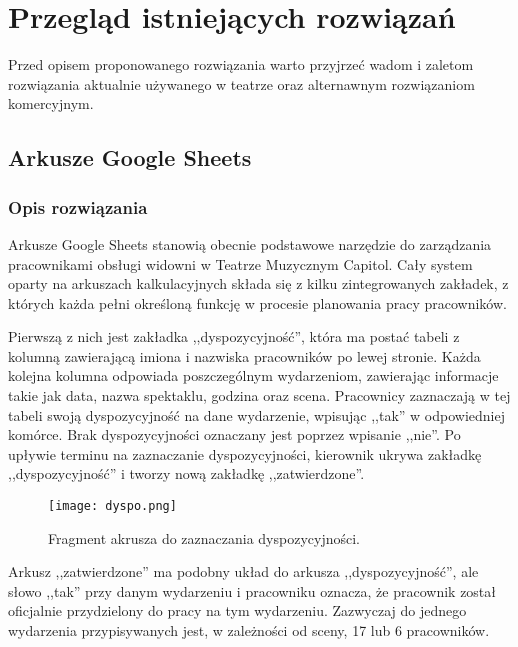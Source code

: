 \documentclass[shortabstract]{iithesis}
\begin{document}
\section{Przegląd istniejących rozwiązań}

Przed opisem proponowanego rozwiązania warto przyjrzeć wadom i zaletom rozwiązania aktualnie używanego w teatrze oraz alternawnym rozwiązaniom komercyjnym.

\subsection{Arkusze Google Sheets}

\subsubsection{Opis rozwiązania}
Arkusze Google Sheets stanowią obecnie podstawowe narzędzie do zarządzania pracownikami obsługi widowni w Teatrze Muzycznym Capitol. Cały system oparty na arkuszach kalkulacyjnych składa się z kilku zintegrowanych zakładek, z których każda pełni określoną funkcję w procesie planowania pracy pracowników.

Pierwszą z nich jest zakładka ,,dyspozycyjność'', która ma postać tabeli z kolumną zawierającą imiona i nazwiska pracowników po lewej stronie. Każda kolejna kolumna odpowiada poszczególnym wydarzeniom, zawierając informacje takie jak data, nazwa spektaklu, godzina oraz scena. Pracownicy zaznaczają w tej tabeli swoją dyspozycyjność na dane wydarzenie, wpisując ,,tak'' w odpowiedniej komórce. Brak dyspozycyjności oznaczany jest poprzez wpisanie ,,nie''. Po upływie terminu na zaznaczanie dyspozycyjności, kierownik ukrywa zakładkę ,,dyspozycyjność'' i tworzy nową zakładkę ,,zatwierdzone''.


\begin{figure}[h] %
\centering %
\texttt{[image: dyspo.png]} %
\caption{Fragment akrusza do zaznaczania dyspozycyjności.} %
\end{figure}


Arkusz ,,zatwierdzone'' ma podobny układ do arkusza ,,dyspozycyjność'', ale słowo ,,tak'' przy danym wydarzeniu i pracowniku oznacza, że pracownik został oficjalnie przydzielony do pracy na tym wydarzeniu. Zazwyczaj do jednego wydarzenia przypisywanych jest, w zależności od sceny, 17 lub 6 pracowników.
\end{document}
